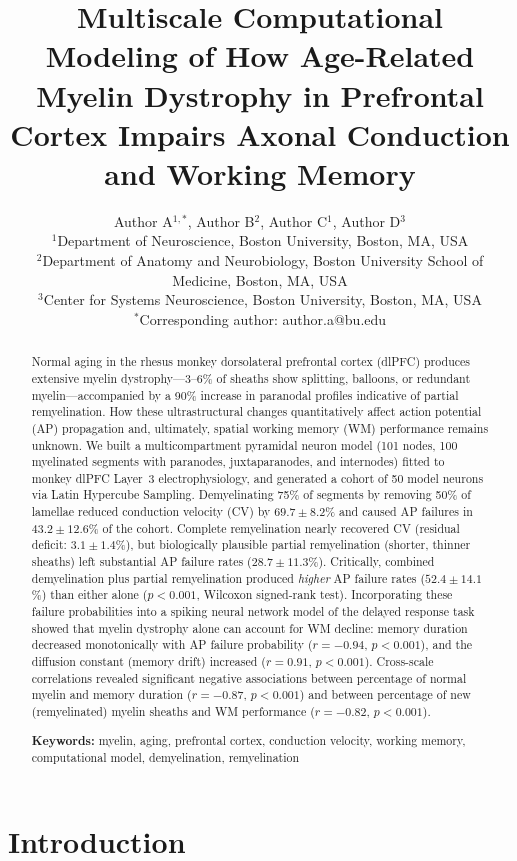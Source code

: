 \documentclass[11pt]{article}
\title{Multiscale Computational Modeling of How Age-Related Myelin Dystrophy in Prefrontal Cortex Impairs Axonal Conduction and Working Memory}
\author{%
  Author A$^{1,*}$, Author B$^{2}$, Author C$^{1}$, Author D$^{3}$ \\[6pt]
  $^{1}$Department of Neuroscience, Boston University, Boston, MA, USA \\
  $^{2}$Department of Anatomy and Neurobiology, Boston University School of Medicine, Boston, MA, USA \\
  $^{3}$Center for Systems Neuroscience, Boston University, Boston, MA, USA \\
  $^{*}$Corresponding author: author.a@bu.edu
}
\date{}
\begin{document}
\maketitle

\begin{abstract}
Normal aging in the rhesus monkey dorsolateral prefrontal cortex (dlPFC) produces extensive myelin dystrophy---3--6\% of sheaths show splitting, balloons, or redundant myelin---accompanied by a 90\% increase in paranodal profiles indicative of partial remyelination. How these ultrastructural changes quantitatively affect action potential (AP) propagation and, ultimately, spatial working memory (WM) performance remains unknown. We built a multicompartment pyramidal neuron model (101 nodes, 100 myelinated segments with paranodes, juxtaparanodes, and internodes) fitted to monkey dlPFC Layer~3 electrophysiology, and generated a cohort of 50 model neurons via Latin Hypercube Sampling. Demyelinating 75\% of segments by removing 50\% of lamellae reduced conduction velocity (CV) by $69.7 \pm 8.2$\% and caused AP failures in $43.2 \pm 12.6$\% of the cohort. Complete remyelination nearly recovered CV (residual deficit: $3.1 \pm 1.4$\%), but biologically plausible partial remyelination (shorter, thinner sheaths) left substantial AP failure rates ($28.7 \pm 11.3$\%). Critically, combined demyelination plus partial remyelination produced \emph{higher} AP failure rates ($52.4 \pm 14.1$\%) than either alone ($p < 0.001$, Wilcoxon signed-rank test). Incorporating these failure probabilities into a spiking neural network model of the delayed response task showed that myelin dystrophy alone can account for WM decline: memory duration decreased monotonically with AP failure probability ($r = -0.94$, $p < 0.001$), and the diffusion constant (memory drift) increased ($r = 0.91$, $p < 0.001$). Cross-scale correlations revealed significant negative associations between percentage of normal myelin and memory duration ($r = -0.87$, $p < 0.001$) and between percentage of new (remyelinated) myelin sheaths and WM performance ($r = -0.82$, $p < 0.001$).

\medskip
\noindent\textbf{Keywords:} myelin, aging, prefrontal cortex, conduction velocity, working memory, computational model, demyelination, remyelination
\end{abstract}

\section{Introduction}
\end{document}
